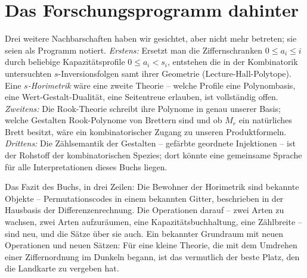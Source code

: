 \section{Das Forschungsprogramm dahinter}

Drei weitere Nachbarschaften haben wir gesichtet, aber nicht mehr
betreten; sie seien als Programm notiert. \emph{Erstens:} Ersetzt
man die Ziffernschranken $0\le a_i\le i$ durch beliebige
Kapazitätsprofile $0\le a_i<s_i$, entstehen die in der Kombinatorik
untersuchten $s$-Inversionsfolgen samt ihrer Geometrie
(Lecture-Hall-Polytope). Eine \emph{$s$-Horimetrik} wäre eine
zweite Theorie -- welche Profile eine Polynombasis, eine
Wert-Gestalt-Dualität, eine Seitentreue erlauben, ist vollständig
offen. \emph{Zweitens:} Die Rook-Theorie schreibt ihre Polynome in
genau unserer Basis; welche Gestalten Rook-Polynome von Brettern
sind und ob $M_r$ ein natürliches Brett besitzt, wäre ein
kombinatorischer Zugang zu unseren Produktformeln.
\emph{Drittens:} Die Zählsemantik der Gestalten -- gefärbte
geordnete Injektionen -- ist der Rohstoff der kombinatorischen
Spezies; dort könnte eine gemeinsame Sprache für alle
Interpretationen dieses Buchs liegen.

\begin{oberflaeche}
Das Fazit des Buchs, in drei Zeilen: Die Bewohner der Horimetrik
sind bekannte Objekte -- Permutationscodes in einem bekannten
Gitter, beschrieben in der Hausbasis der Differenzenrechnung. Die
Operationen darauf -- zwei Arten zu wachsen, zwei Arten
aufzuräumen, eine Kapazitätsbuchhaltung, eine Zählbreite -- sind
neu, und die Sätze über sie auch. Ein bekannter Grundraum mit
neuen Operationen und neuen Sätzen: Für eine kleine Theorie, die
mit dem Umdrehen einer Ziffernordnung im Dunkeln begann, ist das
vermutlich der beste Platz, den die Landkarte zu vergeben hat.
\end{oberflaeche}
